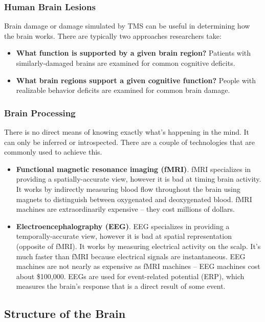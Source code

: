 \documentclass[]{article}
\begin{document}
			\subsubsection{Human Brain Lesions}
				Brain damage or damage simulated by TMS can be useful in determining how the brain works. There are typically two approaches researchers take:
				\begin{itemize}
					\item \textbf{What function is supported by a given brain region?} Patients with similarly-damaged brains are examined for common cognitive deficits.
					\item \textbf{What brain regions support a given cognitive function?} People with realizable behavior deficits are examined for common brain damage. 
				\end{itemize}
			\subsubsection{Brain Processing}
				There is no direct means of knowing exactly what's happening in the mind. It can only be inferred or introspected. There are a couple of technologies that are commonly used to achieve this.
				\begin{itemize}
					\item \textbf{Functional magnetic resonance imaging (fMRI)}. fMRI specializes in providing a spatially-accurate view, however it is bad at timing brain activity. It works by indirectly measuring blood flow throughout the brain using magnets to distinguish between oxygenated and deoxygenated blood. fMRI machines are extraordinarily expensive -- they cost millions of dollars.
					\item \textbf{Electroencephalography (EEG)}. EEG specializes in providing a temporally-accurate view, however it is bad at spatial representation (opposite of fMRI). It works by measuring electrical activity on the scalp. It's much faster than fMRI because electrical signals are instantaneous. EEG machines are not nearly as expensive as fMRI machines -- EEG machines cost about \$100,000. EEGs are used for event-related potential (ERP), which measures the brain's response that is a direct result of some event. 
				\end{itemize}
		\subsection{Structure of the Brain}
\end{document}
